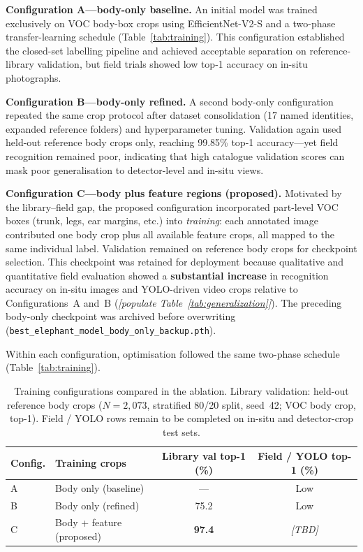 \documentclass[preprint,12pt,3p,times]{elsarticle}
\begin{document}
\textbf{Configuration A---body-only baseline.} An initial model was trained exclusively on VOC body-box crops using EfficientNet-V2-S and a two-phase transfer-learning schedule (Table~\ref{tab:training}). This configuration established the closed-set labelling pipeline and achieved acceptable separation on reference-library validation, but field trials showed low top-1 accuracy on in-situ photographs.

\textbf{Configuration B---body-only refined.} A second body-only configuration repeated the same crop protocol after dataset consolidation (17 named identities, expanded reference folders) and hyperparameter tuning. Validation again used held-out reference body crops only, reaching 99.85\% top-1 accuracy---yet field recognition remained poor, indicating that high catalogue validation scores can mask poor generalisation to detector-level and in-situ views.

\textbf{Configuration C---body plus feature regions (proposed).} Motivated by the library--field gap, the proposed configuration incorporated part-level VOC boxes (trunk, legs, ear margins, etc.) into \emph{training}: each annotated image contributed one body crop plus all available feature crops, all mapped to the same individual label. Validation remained on reference body crops for checkpoint selection. This checkpoint was retained for deployment because qualitative and quantitative field evaluation showed a \textbf{substantial increase} in recognition accuracy on in-situ images and YOLO-driven video crops relative to Configurations~A and~B (\textit{[populate Table~\ref{tab:generalization}]}). The preceding body-only checkpoint was archived before overwriting (\texttt{best\_elephant\_model\_body\_only\_backup.pth}).

Within each configuration, optimisation followed the same two-phase schedule (Table~\ref{tab:training}).

\begin{table}[t]
  \centering
  \caption{Training configurations compared in the ablation. Library validation: held-out reference body crops ($N{=}2{,}073$, stratified 80/20 split, seed~42; VOC body crop, top-1). Field / YOLO rows remain to be completed on in-situ and detector-crop test sets.}
  \label{tab:runs}
  \begin{tabular}{@{}llcc@{}}
    \toprule
    Config. & Training crops & Library val top-1 (\%) & Field / YOLO top-1 (\%) \\
    \midrule
    A & Body only (baseline) & --- & Low \\
    B & Body only (refined) & 75.2 & Low \\
    C & Body + feature (proposed) & \textbf{97.4} & \textit{[TBD]} \\
    \bottomrule
  \end{tabular}
\end{table}
\end{document}
